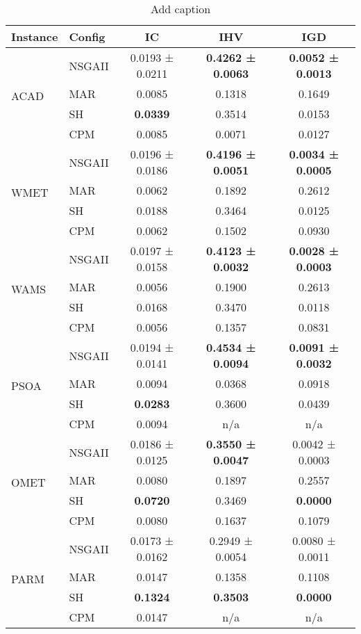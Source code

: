 \begin{table}[htbp]
  \centering
  \caption{Add caption}
    \begin{tabular}{llccc}
    \toprule
    \textbf{Instance} & \textbf{Config} & \textbf{IC} & \textbf{IHV} & \textbf{IGD} \\
    \midrule
    \multirow{4}[2]{*}{ACAD} & NSGAII & 0.0193 ± 0.0211 & \textbf{0.4262 ± 0.0063} & \textbf{0.0052 ± 0.0013} \\
          & MAR   & 0.0085 & 0.1318 & 0.1649 \\
          & SH    & \textbf{0.0339} & 0.3514 & 0.0153 \\
          & CPM   & 0.0085 & 0.0071 & 0.0127 \\
    \multirow{4}[2]{*}{WMET} & NSGAII & 0.0196 ± 0.0186 & \textbf{0.4196 ± 0.0051} & \textbf{0.0034 ± 0.0005} \\
          & MAR   & 0.0062 & 0.1892 & 0.2612 \\
          & SH    & 0.0188 & 0.3464 & 0.0125 \\
          & CPM   & 0.0062 & 0.1502 & 0.0930 \\
    \multirow{4}[2]{*}{WAMS} & NSGAII & 0.0197 ± 0.0158 & \textbf{0.4123 ± 0.0032} & \textbf{0.0028 ± 0.0003} \\
          & MAR   & 0.0056 & 0.1900 & 0.2613 \\
          & SH    & 0.0168 & 0.3470 & 0.0118 \\
          & CPM   & 0.0056 & 0.1357 & 0.0831 \\
    \multirow{4}[2]{*}{PSOA} & NSGAII & 0.0194 ± 0.0141 & \textbf{0.4534 ± 0.0094} & \textbf{0.0091 ± 0.0032} \\
          & MAR   & 0.0094 & 0.0368 & 0.0918 \\
          & SH    & \textbf{0.0283} & 0.3600 & 0.0439 \\
          & CPM   & 0.0094 & n/a   & n/a \\
    \multirow{4}[2]{*}{OMET} & NSGAII & 0.0186 ± 0.0125 & \textbf{0.3550 ± 0.0047} & 0.0042 ± 0.0003 \\
          & MAR   & 0.0080 & 0.1897 & 0.2557 \\
          & SH    & \textbf{0.0720} & 0.3469 & \textbf{0.0000} \\
          & CPM   & 0.0080 & 0.1637 & 0.1079 \\
    \multirow{4}[2]{*}{PARM} & NSGAII & 0.0173 ± 0.0162 & 0.2949 ± 0.0054 & 0.0080 ± 0.0011 \\
          & MAR   & 0.0147 & 0.1358 & 0.1108 \\
          & SH    & \textbf{0.1324} & \textbf{0.3503} & \textbf{0.0000} \\
          & CPM   & 0.0147 & n/a   & n/a \\
    \bottomrule
    \end{tabular}%
  \label{tab:addlabel}%
\end{table}%

